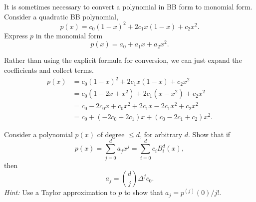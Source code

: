 \begin{exercise}
    It is sometimes necessary to convert a polynomial in BB form to monomial form.
    Consider a quadratic BB polynomial,
    \begin{equation*}
        p(x) = c_0 (1 - x)^2 + 2c_1 x(1 - x) + c_2 x^2.
    \end{equation*}
    Express $p$ in the monomial form
    \begin{equation*}
        p(x) = a_0 + a_1 x + a_2 x^2.
    \end{equation*}
\end{exercise}

\begin{solution}
    Rather than using the explicit formula for conversion, we can just expand the coefficients and collect terms.
    \begin{align*}
        p(x) &= c_0 (1 - x)^2 + 2c_1 x(1 - x) + c_2 x^2 \\
        &= c_0 (1 - 2x + x^2) + 2c_1 (x - x^2) + c_2 x^2 \\
        &= c_0 - 2c_0 x + c_0 x^2 + 2c_1 x - 2c_1 x^2 + c_2 x^2 \\
        &= c_0 + (-2c_0 + 2c_1) x + (c_0 - 2c_1 + c_2) x^2.
    \end{align*}
\end{solution}

\begin{exercise}
    Consider a polynomial $p(x)$ of degree $\leq d$, for arbitrary $d$.
    Show that if
    \begin{equation*}
        p(x) = \sum_{j=0}^d a_j x^j = \sum_{i=0}^d c_i B_i^d(x),
    \end{equation*}
    then
    \begin{equation*}
        a_j = \binom{d}{j} \Delta^j c_0.
    \end{equation*}
    \textit{Hint:} Use a Taylor approximation to $p$ to show that $a_j = p^{(j)}(0)/j!$. %
\end{exercise}

